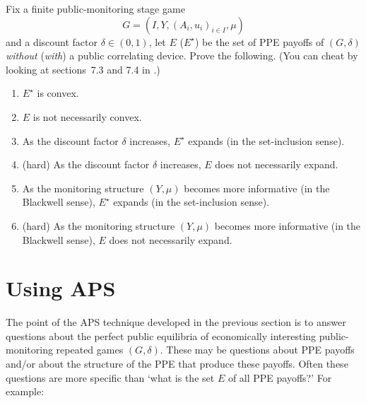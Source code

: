 \begin{exercise}
	\label{exercise:ppe_mcs}
	Fix a finite public-monitoring stage game
	\begin{equation*}
		G = (I,Y,(A_i,u_i)_{i \in I},\mu) 
	\end{equation*}
	and a discount factor $\delta \in (0,1)$, let $E$ ($E^\star$) be the set of PPE payoffs of $(G,\delta)$ \emph{without} (\emph{with}) a public correlating device. Prove the following. (You can cheat by looking at sections~7.3 and 7.4 in \textcite{MailathSamuelson2006}.)

	\begin{enumerate}[label=(\alph*)]

		\item $E^\star$ is convex.

		\item $E$ is not necessarily convex.

		\item As the discount factor $\delta$ increases, $E^\star$ expands (in the set-inclusion sense).

		\item (hard) As the discount factor $\delta$ increases, $E$ does not necessarily expand.

		\item As the monitoring structure $(Y,\mu)$ becomes more informative (in the Blackwell sense), $E^\star$ expands (in the set-inclusion sense).

		\item (hard) As the monitoring structure $(Y,\mu)$ becomes more informative (in the Blackwell sense), $E$ does not necessarily expand.
	
	\end{enumerate}
\end{exercise}



\section{Using APS}
\label{aps:aps}

The point of the APS technique developed in the previous section is to answer questions about the perfect public equilibria of economically interesting public-monitoring repeated games $(G,\delta)$. These may be questions about PPE payoffs and/or about the structure of the PPE that produce these payoffs. Often these questions are more specific than `what is the set $E$ of all PPE payoffs?' For example:

